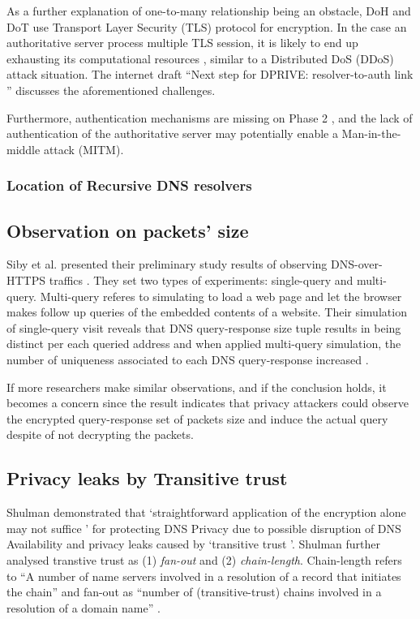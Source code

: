 As a further explanation of one-to-many relationship being an obstacle, DoH \cite{rfc8484} and DoT \cite{hu2016specification} use Transport Layer Security (TLS) protocol \cite{rfc7858} for encryption. In the case an authoritative server process multiple TLS session, it is likely to end up exhausting its computational resources \cite{bhople2012server}, similar to a Distributed DoS (DDoS) attack situation. The internet draft ``Next step for DPRIVE: resolver-to-auth link \cite{I-D.bortzmeyer-dprive-step-2}'' discusses the aforementioned challenges.

Furthermore, authentication mechanisms are missing on Phase 2 \cite{I-D.bortzmeyer-dprive-step-2}, and the lack of authentication of the authoritative server may potentially enable a Man-in-the-middle attack (MITM).

\subsubsection{Location of Recursive DNS resolvers}\label{rr-location}

\FloatBarrier

\subsection{Observation on packets' size}
Siby et al. presented their preliminary study results of observing DNS-over-HTTPS traffics \cite{siby2018dns}.
They set two types of experiments: single-query and multi-query. Multi-query referes to simulating to load a web page and let the browser makes follow up queries of the embedded contents of a website.
Their simulation of single-query visit reveals that DNS query-response size tuple results in being distinct per each queried address and when applied multi-query simulation, the number of uniqueness associated to each DNS query-response increased \cite{siby2018dns}.

If more researchers make similar observations, and if the conclusion holds, it becomes a concern since the result indicates that privacy attackers could observe the encrypted query-response set of packets size and induce the actual query despite of not decrypting the packets.

\subsection{Privacy leaks by Transitive trust}
Shulman demonstrated that `straightforward application of the encryption alone may not suffice \cite{Shulman:2014}' for protecting DNS Privacy due to possible disruption of DNS Availability and privacy leaks caused by `transitive trust \cite{Ramasubramanian:2005}'.
Shulman further analysed transtive trust as (1) \textit{fan-out} and (2) \textit{chain-length}.
Chain-length refers to ``A number of name servers involved in a resolution of a record that initiates the chain'' and fan-out as ``number of (transitive-trust) chains involved in a resolution of a domain name'' \cite{Shulman:2014}.


